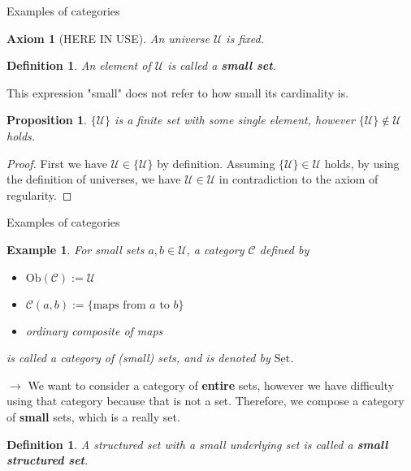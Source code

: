\documentclass[dvipdfmx,10pt,notheorems]{beamer}
\newtheorem{axiom}[theorem]{Axiom}
\newtheorem{definition}[theorem]{Definition}
\newtheorem{example}[theorem]{Example}
\newtheorem{proposition}[theorem]{Proposition}
\renewcommand{\#}{^\sharp}
\begin{document}
	
	\begin{frame}{Examples of categories}
			\begin{axiom}[HERE IN USE]
					An universe $\mathcal{U}$ is fixed.
			\end{axiom}
			\begin{definition}
					An element of $\mathcal{U}$ is called a {\bf small set}.
			\end{definition}
			This expression "small" does not refer to how small its cardinality is.
			\begin{proposition}
					$\{\mathcal{U}\}$ is a finite set with some single element, however
					$\{\mathcal{U}\} \notin \mathcal{U}$ holds.
			\end{proposition}
			\begin{proof}
					First we have $\mathcal{U}\in\{\mathcal{U}\}$ by definition. 
					Assuming $\{\mathcal{U}\}\in \mathcal{U}$ holds,
					by using the definition of universes,
					we have $\mathcal{U}\in\mathcal{U}$ in contradiction to the axiom of regularity.
			\end{proof}
	\end{frame}



	\begin{frame}{Examples of categories}
			\begin{example}
					For small sets $a,b\in\mathcal{U}$,
					a category $\mathcal{C}$ defined by
							\begin{itemize}
									\item $\mathrm{Ob}(\mathcal{C}):=\mathcal{U}$
									\item $\mathcal{C}(a,b):=\{\mbox{maps from }a\mbox{ to }b\}$
									\item ordinary composite of maps 
							\end{itemize}
					is called a category of (small) sets, and is denoted by $\underline{\mathrm{Set}}$. 
			\end{example}
			$\rightarrow$ We want to consider a category of {\bf entire} sets, however we have difficulty
			using that category because that is not a set. Therefore, we compose a category of {\bf small} sets,
			which is a really set.
			\begin{definition}
					A structured set with a small underlying set is called a {\bf small structured set}.
			\end{definition}
	\end{frame}
	
	
\end{document}
